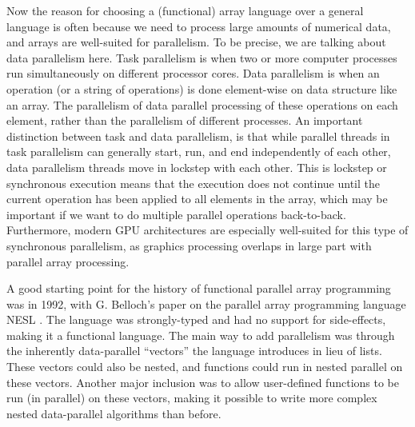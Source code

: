         Now the reason for choosing a (functional) array language over a general language is often because we need to process large amounts of numerical data, and arrays are well-suited for parallelism.
        To be precise, we are talking about data parallelism here.
        Task parallelism is when two or more computer processes run simultaneously on different processor cores.
        Data parallelism is when an operation (or a string of operations) is done element-wise on data structure like an array.
        The parallelism of data parallel processing of these operations on each element, rather than the parallelism of different processes.
        An important distinction between task and data parallelism, is that while parallel threads in task parallelism can generally start, run, and end independently of each other, data parallelism threads move in lockstep with each other.
        This is lockstep or synchronous execution means that the execution does not continue until the current operation has been applied to all elements in the array, which may be important if we want to do multiple parallel operations back-to-back.
        Furthermore, modern GPU architectures are especially well-suited for this type of synchronous parallelism, as graphics processing overlaps in large part with parallel array processing.

        A good starting point for the history of functional parallel array programming was in 1992, with G. Belloch's paper on the parallel array programming language NESL \cite{blelloch1992nesl}.
        The language was strongly-typed and had no support for side-effects, making it a functional language.
        The main way to add parallelism was through the inherently data-parallel ``vectors'' the language introduces in lieu of lists.
        These vectors could also be nested, and functions could run in nested parallel on these vectors.
        Another major inclusion was to allow user-defined functions to be run (in parallel) on these vectors, making it possible to write more complex nested data-parallel algorithms than before.

